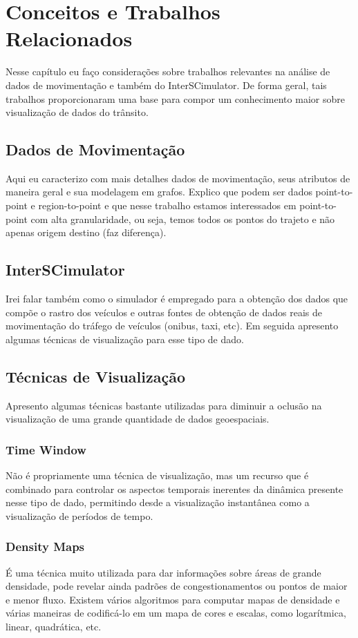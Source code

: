 \chapter{Conceitos e Trabalhos Relacionados}
\label{cap:trabalhos-relacionados}

Nesse capítulo eu faço considerações sobre trabalhos relevantes na análise de
dados de movimentação e também do InterSCimulator.  De forma geral, tais
trabalhos proporcionaram uma base para compor um conhecimento maior sobre
visualização de dados do trânsito.

\section{Dados de Movimentação}

  Aqui eu caracterizo com mais detalhes dados de movimentação, seus atributos de
maneira geral e sua modelagem em grafos. Explico que podem ser dados
point-to-point e region-to-point e que nesse trabalho estamos interessados em
point-to-point com alta granularidade, ou seja, temos todos os pontos do
trajeto e não apenas origem destino (faz diferença).  

\section{InterSCimulator}
  Irei falar também como o
  simulador é empregado para a obtenção dos dados que compõe o rastro dos
  veículos e outras fontes de obtenção de dados reais de movimentação do tráfego
  de veículos (onibus, taxi, etc). Em seguida apresento algumas técnicas de
  visualização para esse tipo de dado.

\section{Técnicas de Visualização}
  Apresento algumas técnicas bastante utilizadas para diminuir a oclusão na
visualização de uma grande quantidade de dados geoespaciais.

\subsection{Time Window}
    Não é propriamente uma técnica de visualização, mas um recurso que é combinado
  para controlar os aspectos temporais inerentes da dinâmica presente nesse tipo
  de dado, permitindo desde a visualização instantânea como a visualização
  de períodos de tempo.
\subsection{Density Maps}
    É uma técnica muito utilizada para dar informações sobre áreas de grande
  densidade, pode revelar ainda padrões de congestionamentos ou pontos de maior
  e menor fluxo. Existem vários algoritmos para computar mapas de densidade e
  várias maneiras de codificá-lo em um mapa de cores e escalas, como logarítmica,
  linear, quadrática, etc.
